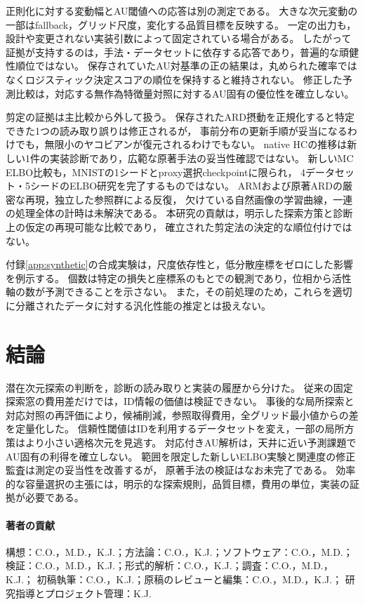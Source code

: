 \documentclass[11pt,a4paper]{ltjsarticle}
\begin{document}
正則化に対する変動幅とAU閾値への応答は別の測定である。
大きな次元変動の一部はfallback，グリッド尺度，変化する品質目標を反映する。
一定の出力も，設計や変更されない実装引数によって固定されている場合がある。
したがって証拠が支持するのは，手法・データセットに依存する応答であり，普遍的な頑健性順位ではない。
保存されていたAU対基準の正の結果は，丸められた確率ではなくロジスティック決定スコアの順位を保持すると維持されない。
修正した予測比較は，対応する無作為特徴量対照に対するAU固有の優位性を確立しない。

剪定の証拠は主比較から外して扱う。
保存されたARD摂動を正規化すると特定できた1つの読み取り誤りは修正されるが，
事前分布の更新手順が妥当になるわけでも，無限小のヤコビアンが復元されるわけでもない。
native HCの推移は新しい1件の実装診断であり，広範な原著手法の妥当性確認ではない。
新しいMC ELBO比較も，MNISTの1シードとproxy選択checkpointに限られ，
4データセット・5シードのELBO研究を完了するものではない。
ARMおよび原著ARDの厳密な再現，独立した参照群による反復，
欠けている自然画像の学習曲線，一連の処理全体の計時は未解決である。
本研究の貢献は，明示した探索方策と診断上の仮定の再現可能な比較であり，
確立された剪定法の決定的な順位付けではない。

付録\ref{app:synthetic}の合成実験は，尺度依存性と，低分散座標をゼロにした影響を例示する。
個数は特定の損失と座標系のもとでの観測であり，位相から活性軸の数が予測できることを示さない。
また，その前処理のため，これらを適切に分離されたデータに対する汎化性能の推定とは扱えない。

\section{結論}\label{sec:conclusion}
潜在次元探索の判断を，診断の読み取りと実装の履歴から分けた。
従来の固定探索窓の費用差だけでは，ID情報の価値は検証できない。
事後的な局所探索と対応対照の再評価により，候補削減，参照取得費用，全グリッド最小値からの差を定量化した。
信頼性閾値はIDを利用するデータセットを変え，一部の局所方策はより小さい適格次元を見逃す。
対応付きAU解析は，天井に近い予測課題でAU固有の利得を確立しない。
範囲を限定した新しいELBO実験と関連度の修正監査は測定の妥当性を改善するが，
原著手法の検証はなお未完了である。
効率的な容量選択の主張には，明示的な探索規則，品質目標，費用の単位，実装の証拠が必要である。

\paragraph{著者の貢献}
構想：C.O.，M.D.，K.J.；方法論：C.O.，K.J.；ソフトウェア：C.O.，M.D.；
検証：C.O.，M.D.，K.J.；形式的解析：C.O.，K.J.；調査：C.O.，M.D.，K.J.；
初稿執筆：C.O.，K.J.；原稿のレビューと編集：C.O.，M.D.，K.J.；
研究指導とプロジェクト管理：K.J.
\end{document}
